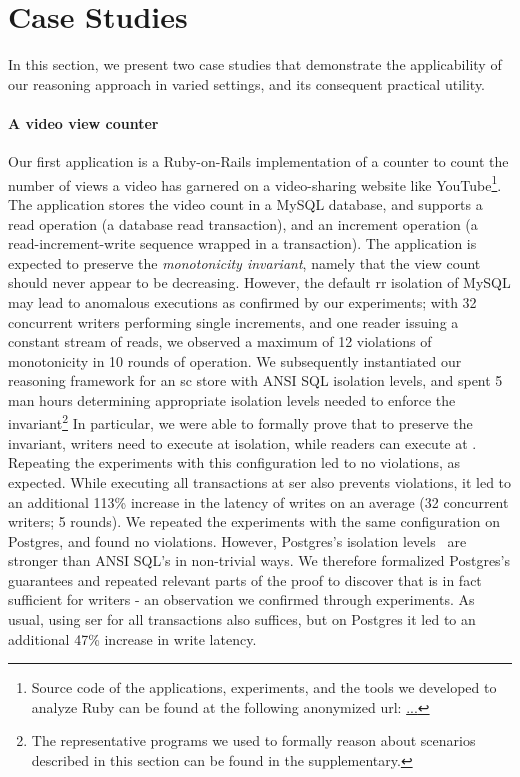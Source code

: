 \section{Case Studies}
\label{sec:case-studies}

In this section, we present two case studies that demonstrate the
applicability of our reasoning approach in varied settings, and its
consequent practical utility.

\paragraph{A video view counter} Our first application is a
Ruby-on-Rails implementation of a counter to count the number of views
a video has garnered on a video-sharing website like
YouTube\footnote{Source code of the applications, experiments, and the
tools we developed to analyze Ruby can be found at the following
anonymized url: \url{...}}. The application stores the video count in
a MySQL database, and supports a read operation (a database read
transaction), and an increment operation (a read-increment-write
sequence wrapped in a transaction). The application is expected to
preserve the \emph{monotonicity invariant}, namely that the view count
should never appear to be decreasing. However, the default {\sc rr}
isolation of MySQL may lead to anomalous executions as confirmed by
our experiments; with 32 concurrent writers performing single
increments, and one reader issuing a constant stream of reads, we
observed a maximum of 12 violations of monotonicity in 10 rounds of
operation. We subsequently instantiated our reasoning framework for an
{\sc sc} store with ANSI SQL isolation levels, and spent 5 man hours
determining appropriate isolation levels needed to enforce the
invariant\footnote{The representative \txnimp programs we used to
formally reason about scenarios described in this section can be found
in the supplementary.} In particular, we were able to formally prove
that to preserve the invariant, writers need to execute at
 isolation, while readers can execute at . Repeating the experiments with this configuration led to
no violations, as expected. While executing all transactions at {\sc
ser} also prevents violations, it led to an additional 113\% increase
in the latency of writes on an average (32 concurrent writers; 5
rounds). We repeated the experiments with the same configuration on
Postgres, and found no violations. However, Postgres's isolation
levels~\cite{postgresiso} are stronger than ANSI SQL's in non-trivial
ways. We therefore formalized Postgres's guarantees and repeated
relevant parts of the proof to discover that  is
in fact sufficient for writers - an observation we confirmed through
experiments. As usual, using {\sc ser} for all transactions also
suffices, but on Postgres it led to an additional 47\% increase in
write latency.


